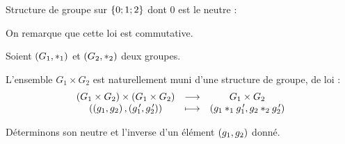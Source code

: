\begin{ex}
Structure de groupe sur \(\left\lbrace0;1;2\right\rbrace\) dont \(0\) est le neutre :

\begin{center}
\end{center}

On remarque que cette loi est commutative.
\end{ex}

\begin{ex}
Soient \(\groupe{G_1}[*_1]\) et \(\groupe{G_2}[*_2]\) deux groupes.

L'ensemble \(G_1\times G_2\) est naturellement muni d'une structure de groupe, de loi : \[\begin{array}[t]{ccc}\left(G_1\times G_2\right)\times\left(G_1\times G_2\right) & \longrightarrow & G_1\times G_2 \\ \left(\left(g_1,g_2\right),\left(g_1^{\,\prime},g_2^{\,\prime}\right)\right) & \longmapsto & \left(g_1*_1g_1^{\,\prime},g_2*_2g_2^{\,\prime}\right)\end{array}\]

Déterminons son neutre et l'inverse d'un élément \(\left(g_1,g_2\right)\) donné.
\end{ex}

